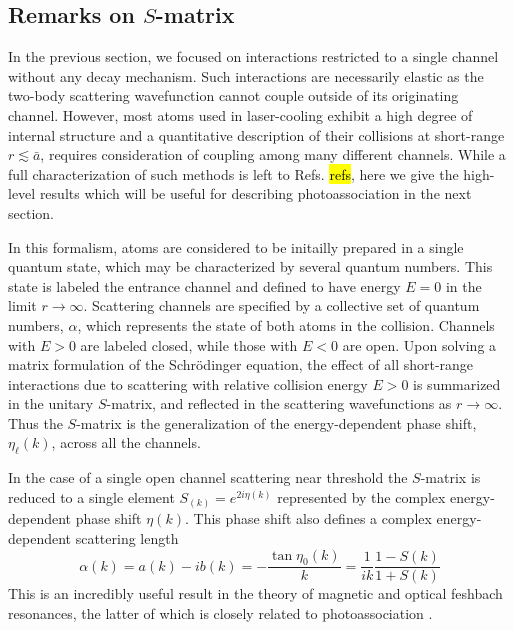 \subsection{Remarks on $S$-matrix}
In the previous section, we focused on interactions restricted to a single channel without any decay mechanism.
Such interactions are necessarily elastic as the two-body scattering wavefunction cannot couple outside of its originating channel.
However, most atoms used in laser-cooling exhibit a high degree of internal structure and a quantitative description of their collisions at short-range $r \lesssim \bar{a} $, requires consideration of coupling among many different channels.
While a full characterization of such methods is left to Refs.\hl{\cite{Hutson2007a}} \hl{refs}, here we give the high-level results which will be useful for describing photoassociation in the next section.

In this formalism, atoms are considered to be initailly prepared in a single quantum state, which may be characterized by several quantum numbers.
This state is labeled the entrance channel and defined to have energy $E=0$ in the limit $r\rightarrow\infty$.
Scattering channels are specified by a collective set of quantum numbers, $\alpha$, which represents the state of both atoms in the collision.
Channels with $E>0$ are labeled closed, while those with $E<0$ are open.
Upon solving a matrix formulation of the Schr\"{o}dinger equation, the effect of all short-range interactions due to scattering with relative collision energy $E > 0$ is summarized in the unitary $S$-matrix, and reflected in the scattering wavefunctions as $r\rightarrow\infty$. 
Thus the $S$-matrix is the generalization of the energy-dependent phase shift, $\eta_{\ell}(k)$, across all the channels.

In the case of a single open channel scattering near threshold the $S$-matrix is reduced to a single element $S_(k)=e^{2i\eta(k)}$ represented by the complex energy-dependent phase shift $\eta(k)$.
This phase shift also defines a complex energy-dependent scattering length
\begin{equation}
	\alpha(k) = a(k) - i b(k) = -\frac{\tan \eta_0(k)}{k} = \frac{1}{ik} \frac{1-S(k)}{1+S(k)}
\end{equation}
This is an incredibly useful result in the theory of magnetic and optical feshbach resonances, the latter of which is closely related to photoassociation \cite{Chin2010,Nicholson2015a}.

